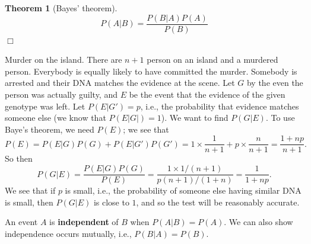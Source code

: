 \documentclass[letter-paper]{tufte-book}
\newtheorem{theorem}{\color{pastel-blue}Theorem}[section]
\newenvironment{example}[1][Example]{\begin{trivlist}
\item[\hskip \labelsep {\bfseries #1}]}{\end{trivlist}}
\newcommand\Def[1]{\textbf{#1}}
\newcommand{\qedwhite}{\hfill \ensuremath{\Box}}
\begin{document}
\begin{theorem}[Bayes' theorem]
\begin{equation*}
  P(A|B)=\frac{P(B|A)P(A)}{P(B)}
\end{equation*}
\qedwhite
\end{theorem}

\begin{example}
  Murder on the island. There are $n+1$ person on an island and a murdered
  person. Everybody is equally likely to have committed the murder. Somebody is
  arrested and their DNA matches the evidence at the scene. Let $G$ by the even
  the person was actually guilty, and $E$ be the event that the evidence of the
  given genotype was left. Let $P(E|G')=p$, i.e., the probability that evidence
  matches someone else (we know that $P(E|G|)=1$). We want to find $P(G|E)$. To
  use Baye's theorem, we need $P(E)$; we see that
  \begin{equation*}
    P(E)=P(E|G)P(G)+P(E|G')P(G')=1\times\frac{1}{n+1}+p\times\frac{n}{n+1}
    =\frac{1+np}{n+1}.
  \end{equation*}
  So then
  \begin{equation*}
    P(G|E)=\frac{P(E|G)P(G)}{P(E)}=\frac{1\times 1/(n+1)}{p(n+1)/(1+n)}=
    \frac{1}{1+np}.
  \end{equation*}
  We see that if $p$ is small, i.e., the probability of someone else having
  similar DNA is small, then $P(G|E)$ is close to $1$, and so the test will be
  reasonably accurate.
\end{example}

An event $A$ is \Def{independent} of $B$ when $P(A|B)=P(A)$. We can also
show independence occurs mutually, i.e., $P(B|A)=P(B)$.
\end{document}
